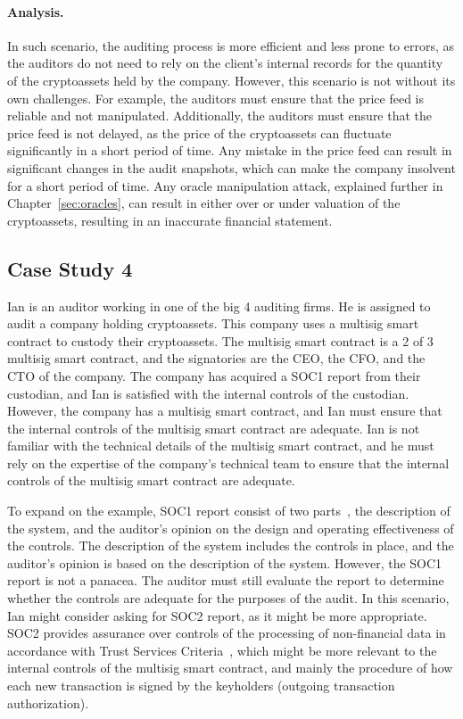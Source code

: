 \paragraph{Analysis.} In such scenario, the auditing process is more efficient and less prone to errors, as the auditors do not need to rely on the client's internal records for the quantity of the cryptoassets held by the company. However, this scenario is not without its own challenges. For example, the auditors must ensure that the price feed is reliable and not manipulated. Additionally, the auditors must ensure that the price feed is not delayed, as the price of the cryptoassets can fluctuate significantly in a short period of time. Any mistake in the price feed can result in significant changes in the audit snapshots, which can make the company insolvent for a short period of time. Any oracle manipulation attack, explained further in Chapter~\ref{sec:oracles}, can result in either over or under valuation of the cryptoassets, resulting in an inaccurate financial statement.




\subsection{Case Study 4} \label{sec:auditing:case-studies:internalcontrol} %
Ian is an auditor working in one of the big 4 auditing firms. He is assigned to audit a company holding cryptoassets. This company uses a multisig smart contract to custody their cryptoassets. The multisig smart contract is a 2 of 3 multisig smart contract, and the signatories are the CEO, the CFO, and the CTO of the company. The company has acquired a SOC1 report from their custodian, and Ian is satisfied with the internal controls of the custodian. However, the company has a multisig smart contract, and Ian must ensure that the internal controls of the multisig smart contract are adequate. Ian is not familiar with the technical details of the multisig smart contract, and he must rely on the expertise of the company's technical team to ensure that the internal controls of the multisig smart contract are adequate.

To expand on the example, SOC1 report consist of two parts~\cite{RCGTsocreport}, the description of the system, and the auditor's opinion on the design and operating effectiveness of the controls. The description of the system includes the controls in place, and the auditor's opinion is based on the description of the system. However, the SOC1 report is not a panacea. The auditor must still evaluate the report to determine whether the controls are adequate for the purposes of the audit. In this scenario, Ian might consider asking for SOC2 report, as it might be more appropriate. SOC2 provides assurance over controls of the processing of non-financial data in accordance with Trust Services Criteria~\cite{bdosocreports}, which might be more relevant to the internal controls of the multisig smart contract, and mainly the procedure of how each new transaction is signed by the keyholders (\eg outgoing transaction authorization). 

